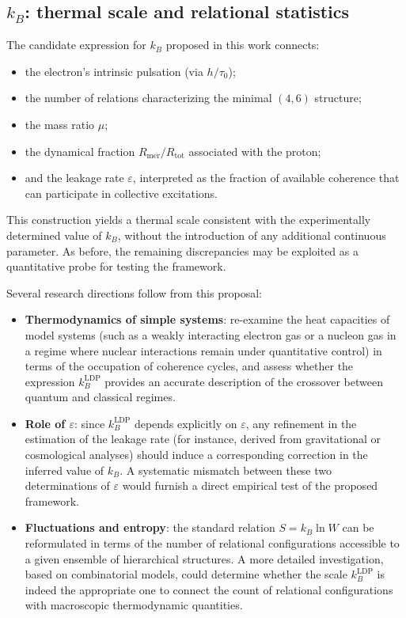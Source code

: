 \documentclass[11pt,a4paper]{article}
\begin{document}
\subsection{\texorpdfstring{\(k_{B}\)}{kB}: thermal scale and relational statistics}
The candidate expression for \(k_{B}\) proposed in this work connects:
\begin{itemize}[label=-]
    \item the electron’s intrinsic pulsation (via \(h/\tau_{0}\));
    \item the number of relations characterizing the minimal \((4,6)\) structure;
    \item the mass ratio \(\mu\);
    \item the dynamical fraction \(R_{\mathrm{mer}}/R_{\mathrm{tot}}\) associated with the proton;
    \item and the leakage rate \(\varepsilon\), interpreted as the fraction of available coherence that can participate in collective excitations.
\end{itemize}
This construction yields a thermal scale consistent with the experimentally determined value of \(k_{B}\), without the introduction of any additional continuous parameter. As before, the remaining discrepancies may be exploited as a quantitative probe for testing the framework.

Several research directions follow from this proposal:
\begin{itemize}[label=-]
    \item \textbf{Thermodynamics of simple systems}: re-examine the heat capacities of model systems (such as a weakly interacting electron gas or a nucleon gas in a regime where nuclear interactions remain under quantitative control) in terms of the occupation of coherence cycles, and assess whether the expression \(k_{B}^{\mathrm{LDP}}\) provides an accurate description of the crossover between quantum and classical regimes.
    \item \textbf{Role of \(\varepsilon\)}: since \(k_{B}^{\mathrm{LDP}}\) depends explicitly on \(\varepsilon\), any refinement in the estimation of the leakage rate (for instance, derived from gravitational or cosmological analyses) should induce a corresponding correction in the inferred value of \(k_{B}\). A systematic mismatch between these two determinations of \(\varepsilon\) would furnish a direct empirical test of the proposed framework.
    \item \textbf{Fluctuations and entropy}: the standard relation \(S = k_{B} \ln W\) can be reformulated in terms of the number of relational configurations accessible to a given ensemble of hierarchical structures. A more detailed investigation, based on combinatorial models, could determine whether the scale \(k_{B}^{\mathrm{LDP}}\) is indeed the appropriate one to connect the count of relational configurations with macroscopic thermodynamic quantities.
\end{itemize}
\end{document}

